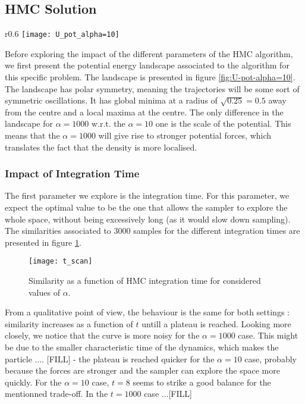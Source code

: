 \documentclass[a4paper, 12pt,oneside]{article}
\begin{document}
		\subsection{HMC Solution}
			\begin{wrapfigure}[18]{r}{0.6\textwidth}
				\centering
					\vspace{-2em}
					\texttt{[image: U\_pot\_alpha=10]}
					\caption{Potential energy landscape associated to HMC algorithm for $\alpha=10$. Version for $\alpha=1000$ is identical, except scales are scaled by a factor of 100.}
					\label{fig:U-pot-alpha=10}
			\end{wrapfigure}
			Before exploring the impact of the different parameters of the HMC algorithm, we first present the potential energy landscape associated to the algorithm for this specific problem. The landscape is presented in figure \ref{fig:U-pot-alpha=10}. 
			The landscape has polar symmetry, meaning the trajectories will be some sort of symmetric oscillations. It has global minima at a radius of $\sqrt{0.25}=0.5$ away from the centre and a local maxima at the centre. The only difference in the landscape for $\alpha=1000$ w.r.t. the $\alpha=10$ one is the scale of the potential. This means that the $\alpha=1000$ will give rise to stronger potential forces, which translates the fact that the density is more localised. 
			\subsubsection{Impact of Integration Time}
			The first parameter we explore is the integration time. For this parameter, we expect the optimal value to be the one that allows the sampler to explore the whole space, without being excessively long (as it would slow down sampling).
			The similarities associated to 3000 samples for the different integration times are presented in figure \ref{fig:t-scan}.
			\begin{figure}[htb]
				\centering
					\vspace{0em}
					\texttt{[image: t\_scan]}
					\caption{Similarity as a function of HMC integration time for considered values of $\alpha$.}
					\label{fig:t-scan}
			\end{figure}
			From a qualitative point of view, the behaviour is the same for both settings : similarity increases as a function of $t$ untill a plateau is reached. Looking more closely, we notice that the curve is more noisy for the $\alpha=1000$ case. This might be due to the smaller characteristic time of the dynamics, which makes the particle .... [FILL]
			- the plateau is reached quicker for the $\alpha=10$ case, probably because the forces are stronger and the sampler can explore the space more quickly.
			For the $\alpha=10$ case, $t=8$ seems to strike a good balance for the mentionned trade-off. In the $t=1000$ case ...[FILL] 
\end{document}
